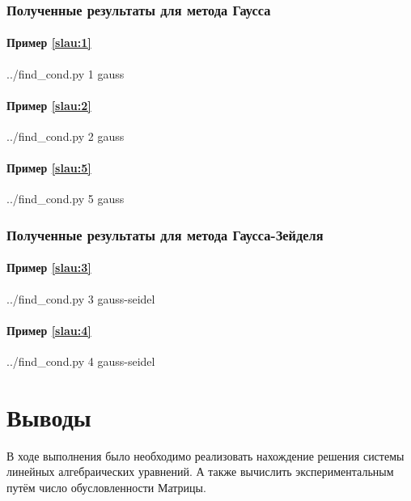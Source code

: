 \documentclass[a4paper]{article}
\begin{document}
\subsubsection{Полученные результаты для метода Гаусса}

\paragraph{Пример \eqref{slau:1}}
\bash[stdout]
../find_cond.py 1 gauss
\END

\paragraph{Пример \eqref{slau:2}}
\bash[stdout]
../find_cond.py 2 gauss
\END

\paragraph{Пример \eqref{slau:5}}
\bash[stdout]
../find_cond.py 5 gauss
\END

\subsubsection{Полученные результаты для метода Гаусса-Зейделя}


\paragraph{Пример \eqref{slau:3}}
\bash[stdout]
../find_cond.py 3 gauss-seidel
\END

\paragraph{Пример \eqref{slau:4}}
\bash[stdout]
../find_cond.py 4 gauss-seidel
\END

\section{Выводы}
В ходе выполнения было необходимо реализовать нахождение решения системы линейных алгебраических уравнений. А также вычислить экспериментальным путём число обусловленности Матрицы.
\end{document}

